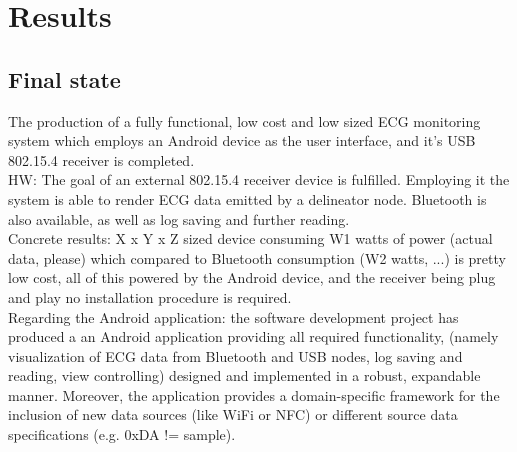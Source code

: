 \chapter{Results}
\label{cha:results}

	\section{Final state}
	\label{sec:end-state}
	

		The production of a fully functional, low cost and low sized ECG monitoring system which employs an Android device as the user interface, and it's USB 802.15.4 receiver is completed.\\

		HW: The goal of an external 802.15.4 receiver device is fulfilled. Employing it the system is able to render ECG data emitted by a delineator node. Bluetooth is also available, as well as log saving and further reading.\\

		Concrete results: X x Y x Z sized device consuming W1 watts of power (actual data, please) which compared to Bluetooth consumption (W2 watts, ...) is pretty low cost, all of this powered by the Android device, and the receiver being plug and play no installation procedure is required.\\

		Regarding the Android application: the software development project has produced a an Android application providing all required functionality, (namely visualization of ECG data from Bluetooth and USB nodes, log saving and reading, view controlling) designed and implemented in a robust, expandable manner. Moreover, the application provides a domain-specific framework for the inclusion of new data sources (like WiFi or NFC) or different source data specifications (e.g. 0xDA != sample).

